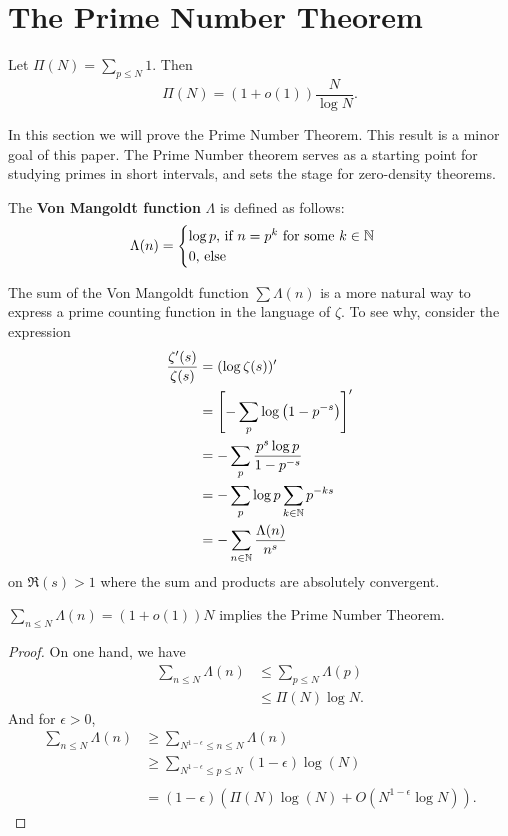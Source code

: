 \section{The Prime Number Theorem}

\begin{theorem}
    Let $\Pi(N)=\sum_{p\leq N} 1$. Then \[
        \Pi(N) = (1+o(1))\frac{N}{\log N}.
    \]
\end{theorem}

In this section we will prove the Prime Number Theorem. This result is a minor goal of this paper.
The Prime Number theorem serves as a starting point for
studying primes in short intervals, and sets the stage for zero-density theorems.
\begin{definition}
    The \textbf{Von Mangoldt function} $\Lambda$ is defined as follows:
    \[
        \Lambda(n) = \begin{cases}
            \log p \textrm{, if $n = p^k$ for some $k\in\mathbb{N}$}\\
            0 \textrm{, else}
        \end{cases}
    \]
\end{definition}
The sum of the Von Mangoldt function $\sum\Lambda (n)$ is a more natural way to express
a prime counting function in the language of $\zeta$. To see why, consider the expression
\begin{align*}
    \frac{\zeta '(s)}{\zeta(s)} &= (\log\zeta(s))'\\
    &= \left[ -\sum_{p} \log\left(1-p^{-s}\right)\right]^{\prime}\\
    &= - \sum_{p} \frac{p^s \log p }{1-p^{-s}}\\
    &= -\sum_{p} \log p \sum_{k\in\mathbb{N}} p^{-ks}\\
    &= - \sum_{n\in\mathbb{N}} \frac{\Lambda(n)}{n^s}
\end{align*}
on $\Re(s)>1$ where the sum and products are absolutely convergent.
\begin{proposition}\label{mangoldtpnt}
    $\sum_{n\leq N} \Lambda(n) = (1+o(1))N$ implies the Prime Number Theorem.
\end{proposition}
\begin{proof}
    On one hand, we have \begin{align*}
        \sum_{n\leq N }\Lambda(n) &\leq \sum_{p \leq N }\Lambda(p)
        \\ &\leq \Pi(N){\log N}.
    \end{align*}
    And for $\epsilon>0$,
    \begin{align*}
        \sum_{n\leq N }\Lambda(n) &\geq \sum_{N^{1-\epsilon}\leq n\leq N }\Lambda(n)
        \\ &\geq \sum_{N^{1-\epsilon}\leq p \leq N }(1-\epsilon) \log(N)\\
        \\&= (1-\epsilon) (\Pi(N)\log(N) + O(N^{1-\epsilon}\log N)).
    \end{align*}
\end{proof}
